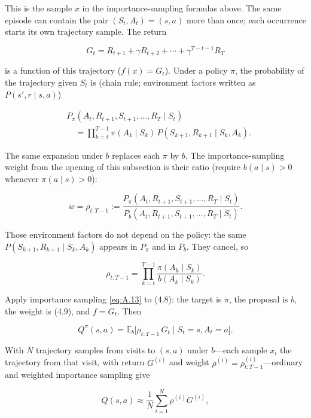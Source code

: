This is the sample $x$ in the importance-sampling formulas above. The same episode can contain the pair $(S_t,A_t)=(s,a)$ more than once; each occurrence starts its own trajectory sample. The return

\[
G_t=R_{t+1}+\gamma R_{t+2}+\cdots+\gamma^{T-t-1}R_T
\]

is a function of this trajectory ($f(x)=G_t$). Under a policy $\pi$, the probability of the trajectory given $S_t$ is (chain rule; environment factors written as $P(s',r\mid s,a)$)

\[
\begin{aligned}
&P_\pi(A_t,R_{t+1},S_{t+1},\ldots,R_T\mid S_t)
\\
&\quad=
\prod_{k=t}^{T-1}
\pi(A_k\mid S_k)\,
P(S_{k+1},R_{k+1}\mid S_k,A_k).
\end{aligned}
\]

The same expansion under $b$ replaces each $\pi$ by $b$. The importance-sampling weight from the opening of this subsection is their ratio (require $b(a\mid s)>0$ whenever $\pi(a\mid s)>0$):

\begin{equation}
w
=
\rho_{t:T-1}
:=
\frac{P_\pi(A_t,R_{t+1},S_{t+1},\ldots,R_T\mid S_t)}{P_b(A_t,R_{t+1},S_{t+1},\ldots,R_T\mid S_t)}.
\tag{4.9}
\end{equation}

Those environment factors do not depend on the policy: the same $P(S_{k+1},R_{k+1}\mid S_k,A_k)$ appears in $P_\pi$ and in $P_b$. They cancel, so

\[
\rho_{t:T-1}
=
\prod_{k=t}^{T-1}
\frac{\pi(A_k\mid S_k)}{b(A_k\mid S_k)}.
\]

Apply importance sampling \eqref{eq:A.13} to (4.8): the target is $\pi$, the proposal is $b$, the weight is (4.9), and $f=G_t$. Then

\begin{equation}
Q^\pi(s,a)
=
\mathbb{E}_b\bigl[\rho_{t:T-1}\,G_t\mid S_t=s,A_t=a\bigr].
\tag{4.10}
\end{equation}

With $N$ trajectory samples from visits to $(s,a)$ under $b$---each sample $x_i$ the trajectory from that visit, with return $G^{(i)}$ and weight $\rho^{(i)}=\rho_{t:T-1}^{(i)}$---ordinary and weighted importance sampling give

\begin{equation}
Q(s,a)
\approx
\frac{1}{N}\sum_{i=1}^{N}\rho^{(i)}G^{(i)},
\tag{4.11}
\end{equation}

